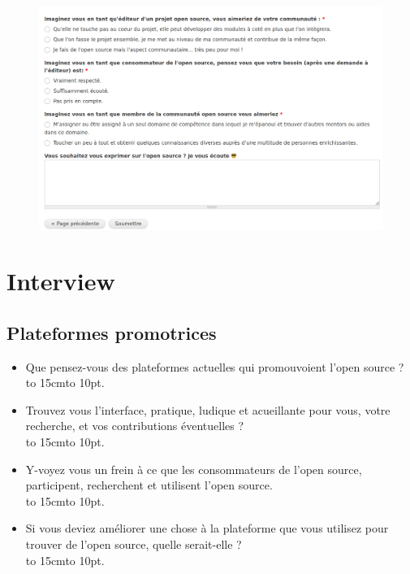 	\begin{figure}[t]
		\includegraphics[scale=0.24]{./img/f5.png}
	\end{figure}	
\chapter*{Interview}

\section*{Plateformes promotrices}

\begin{itemize}[label=\textbullet, font=\LARGE \color{burntorange}]
	\item Que pensez-vous des plateformes actuelles qui promouvoient l'open source ?\\
	\hbox to 15cm{\leaders\hbox to 10pt{\hss . \hss}\hfil}
	\item Trouvez vous l'interface, pratique, ludique et acueillante pour vous, votre recherche, et vos contributions éventuelles ?\\
	\hbox to 15cm{\leaders\hbox to 10pt{\hss . \hss}\hfil}
	\item Y-voyez vous un frein à ce que les consommateurs de l'open source, participent, recherchent et utilisent l'open source.\\
	\hbox to 15cm{\leaders\hbox to 10pt{\hss . \hss}\hfil}
	\item Si vous deviez améliorer une chose à la plateforme que vous utilisez pour trouver de l'open source, quelle serait-elle ?\\
	\hbox to 15cm{\leaders\hbox to 10pt{\hss . \hss}\hfil}

\end{itemize}


